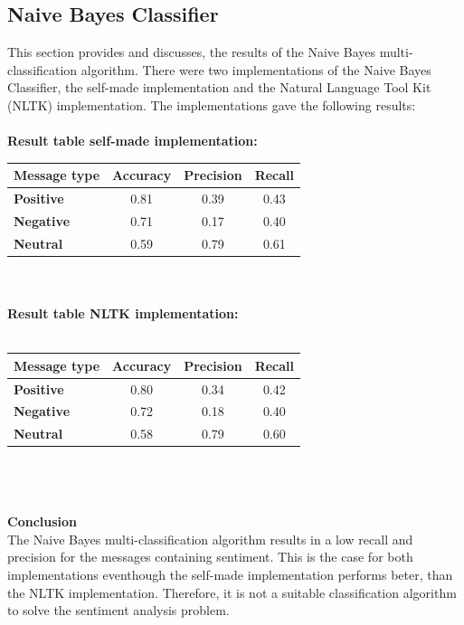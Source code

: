 \documentclass[11pt]{article}
\begin{document}
\subsection{Naive Bayes Classifier}
This section provides and discusses, the results of the Naive Bayes multi-classification algorithm. There were two implementations of the Naive Bayes Classifier, the self-made implementation and the Natural Language Tool Kit (NLTK) implementation. The implementations gave the following results:\\\\
\textbf{Result table self-made implementation:}\\
\begin{tabular}{| l || c | c | c |}
\hline
\textbf{Message type} & \textbf{Accuracy} & \textbf{Precision} & \textbf{Recall}\\
\hline \hline
\textbf{Positive} & 0.81 & 0.39 & 0.43\\
\hline
\textbf{Negative} & 0.71 & 0.17 & 0.40\\
\hline
\textbf{Neutral}  & 0.59 & 0.79 & 0.61\\
\hline
\end{tabular}\\\\
\textbf{Result table NLTK implementation:}\\\\
\begin{tabular}{| l || c | c | c |}
\hline
\textbf{Message type} & \textbf{Accuracy} & \textbf{Precision} & \textbf{Recall}\\
\hline \hline
\textbf{Positive} & 0.80 & 0.34 & 0.42\\
\hline
\textbf{Negative} & 0.72 & 0.18 & 0.40\\
\hline
\textbf{Neutral}  & 0.58 & 0.79 & 0.60\\
\hline
\end{tabular}\\\\\\
\textbf{Conclusion}\\
The Naive Bayes multi-classification algorithm results in a low recall and precision for the messages containing sentiment. This is the case for both implementations eventhough the self-made implementation performs beter, than the NLTK implementation. Therefore, it is not a suitable classification algorithm to solve the sentiment analysis problem.
\end{document}
